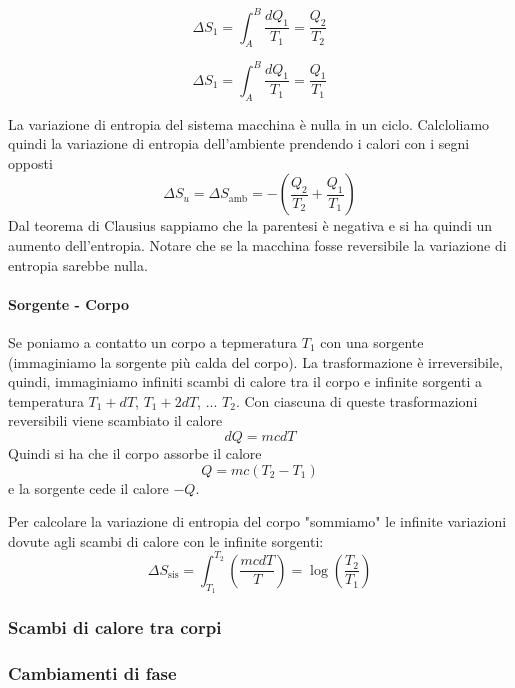 \documentclass[x11names]{report}
\begin{document}
	\begin{minipage}{0.49\textwidth}
		\[ 
		\Delta S_{1} = \int_{A}^{B}\frac{dQ_{1}}{T_{1}} = \frac{Q_{2}}{T_{2}}
		\]
	\end{minipage}
	\begin{minipage}{0.49\textwidth}
		\[ 
		\Delta S_{1} = \int_{A}^{B}\frac{dQ_{1}}{T_{1}} = 
		\frac{Q_{1}}{T_{1}}
		\]
	\end{minipage}
	La variazione di entropia del sistema macchina è nulla in un ciclo. Calcloliamo quindi la variazione di entropia dell'ambiente prendendo i calori con i segni opposti
	\[ 
	\Delta S_{u} = \Delta S_{\text{amb}}  = -\left(\frac{Q_{2}}{T_{2}} + \frac{Q_{1}}{T_{1}}\right)
	\]
	Dal teorema di Clausius sappiamo che la parentesi è negativa e si ha quindi un aumento dell'entropia. Notare che se la macchina fosse reversibile la variazione di entropia sarebbe nulla.
	
	\paragraph{Sorgente - Corpo}
	Se poniamo a contatto un corpo a tepmeratura \(T_{1}\) con una sorgente (immaginiamo la sorgente più calda del corpo). La trasformazione è irreversibile, quindi, immaginiamo infiniti scambi di calore tra il corpo e infinite sorgenti a temperatura \(T_{1} + dT\), \(T_{1} + 2dT\), ... \(T_{2}\). Con ciascuna di queste trasformazioni reversibili viene scambiato il calore 
	\[ 
	dQ = mcdT 
	\]
	Quindi si ha che il corpo assorbe il calore
	\[ 
	Q = mc(T_{2} - T_{1})
	\]
	e la sorgente cede il calore \(-Q\). 
	
	Per calcolare la variazione di entropia del corpo "sommiamo" le infinite variazioni dovute agli scambi di calore con le infinite sorgenti:
	\[ 
	\Delta S_{\text{sis}} = \int_{T_{1}}^{T_{2}}\left(\frac{mcdT}{T}\right) = \log\left(\frac{T_{2}}{T_{1}}\right)
	\]
	
	
	\subsubsection{Scambi di calore tra corpi}
	\subsubsection{Cambiamenti di fase}
	
\end{document}
